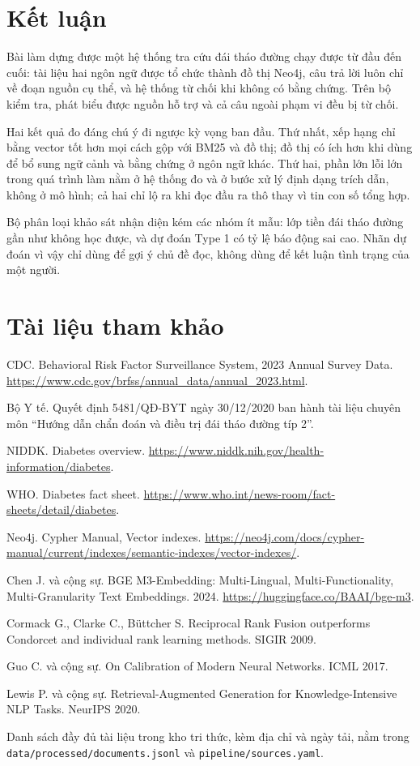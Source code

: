 \documentclass[11pt,a4paper]{article}
\begin{document}
\section{Kết luận}

Bài làm dựng được một hệ thống tra cứu đái tháo đường chạy được từ đầu đến cuối: \nDocs{} tài liệu hai ngôn ngữ được
tổ chức thành đồ thị Neo4j, câu trả lời luôn chỉ về đoạn nguồn cụ thể, và hệ thống từ chối khi không có bằng chứng.
Trên bộ kiểm tra, \supportedTwo{} phát biểu được nguồn hỗ trợ và cả \nOos{} câu ngoài phạm vi đều bị từ chối.

Hai kết quả đo đáng chú ý đi ngược kỳ vọng ban đầu. Thứ nhất, xếp hạng chỉ bằng vector tốt hơn mọi cách gộp với BM25
và đồ thị; đồ thị có ích hơn khi dùng để bổ sung ngữ cảnh và bằng chứng ở ngôn ngữ khác. Thứ hai, phần lớn lỗi lớn
trong quá trình làm nằm ở hệ thống đo và ở bước xử lý định dạng trích dẫn, không ở mô hình; cả hai chỉ lộ ra khi đọc
đầu ra thô thay vì tin con số tổng hợp.

Bộ phân loại khảo sát nhận diện kém các nhóm ít mẫu: lớp tiền đái tháo đường gần như không học được, và dự đoán Type 1
có tỷ lệ báo động sai cao. Nhãn dự đoán vì vậy chỉ dùng để gợi ý chủ đề đọc, không dùng để kết luận tình trạng của
một người.

\section{Tài liệu tham khảo}
\sloppy

\begin{enumerate}[label={[\arabic*]}]
  \item CDC. Behavioral Risk Factor Surveillance System, 2023 Annual Survey Data. \url{https://www.cdc.gov/brfss/annual_data/annual_2023.html}.
  \item Bộ Y tế. Quyết định 5481/QĐ-BYT ngày 30/12/2020 ban hành tài liệu chuyên môn “Hướng dẫn chẩn đoán và điều trị đái tháo đường típ 2”.
  \item NIDDK. Diabetes overview. \url{https://www.niddk.nih.gov/health-information/diabetes}.
  \item WHO. Diabetes fact sheet. \url{https://www.who.int/news-room/fact-sheets/detail/diabetes}.
  \item Neo4j. Cypher Manual, Vector indexes. \url{https://neo4j.com/docs/cypher-manual/current/indexes/semantic-indexes/vector-indexes/}.
  \item Chen J. và cộng sự. BGE M3-Embedding: Multi-Lingual, Multi-Functionality, Multi-Granularity Text Embeddings. 2024. \url{https://huggingface.co/BAAI/bge-m3}.
  \item Cormack G., Clarke C., Büttcher S. Reciprocal Rank Fusion outperforms Condorcet and individual rank learning methods. SIGIR 2009.
  \item Guo C. và cộng sự. On Calibration of Modern Neural Networks. ICML 2017.
  \item Lewis P. và cộng sự. Retrieval-Augmented Generation for Knowledge-Intensive NLP Tasks. NeurIPS 2020.
\end{enumerate}

Danh sách đầy đủ \nDocs{} tài liệu trong kho tri thức, kèm địa chỉ và ngày tải, nằm trong
\texttt{data/processed/documents.jsonl} và \texttt{pipeline/sources.yaml}.
\end{document}
